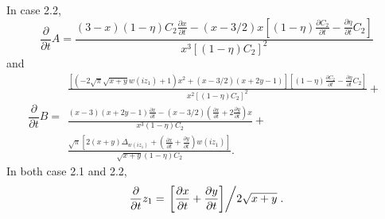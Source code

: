 In case 2.2,
\begin{equation}
 \frac{\partial}{\partial t} A = \frac{(3-x) (1-\eta)C_2 \frac{\partial x}{\partial t} - (x - 3/2) x \left[(1-\eta)\frac{\partial C_2}{\partial t} - \frac{\partial \eta}{\partial t}C_2\right]}{x^3 \left[(1-\eta)C_2\right]^2}
\end{equation}
and
\begin{equation}
\frac{\partial}{\partial t} B =
\begin{array}{l}
\frac{\left[\left(-2 \sqrt{\pi} \sqrt{x+y} w(iz_1) + 1\right) x^2 +
                     \left(x - 3/2\right)\left(x + 2 y - 1\right)\right]
                         \left[(1-\eta)\frac{\partial C_2}{\partial t} - \frac{\partial \eta}{\partial t}C_2\right]}{x^2 \left[(1-\eta)C_2\right]^2} + \\[5pt]
 \frac{(x - 3)(x + 2 y - 1) \frac{\partial x}{\partial t} -
                     (x - 3/2) (\frac{\partial x}{\partial t} + 2 \frac{\partial y}{\partial t}) x}
                   {x^3 (1-\eta)C_2} + \\[5pt] 
                     \frac{\sqrt{\pi}\left[2 (x + y) \Delta_{w(iz_1)} +
                     (\frac{\partial x}{\partial t} + \frac{\partial y}{\partial t}) w(iz_1)\right]}
                   {\sqrt{x+y}(1-\eta)C_2}.
\end{array}
\end{equation}
In both case 2.1 and 2.2,
\begin{equation}
 \frac{\partial}{\partial t} z_1 = \left.\left[\frac{\partial x}{\partial t} + \frac{\partial y}{\partial t}\right]\middle/2\sqrt{x+y}\right..
\end{equation}

